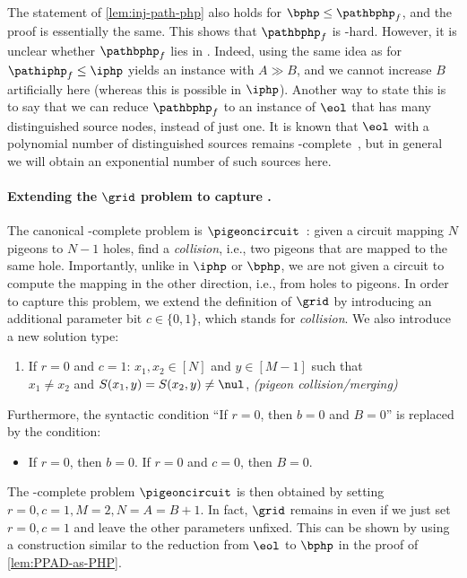 The statement of \cref{lem:inj-path-php} also holds for $\bphp\leq \pathbphp_f$, and the proof is essentially the same. This shows that $\pathbphp_f$ is \PPAD-hard. However, it is unclear whether $\pathbphp_f$ lies in \PPAD. Indeed, using the same idea as for $\pathiphp_f \leq \iphp$ yields an instance with $A \gg B$, and we cannot increase $B$ artificially here (whereas this is possible in $\iphp$). Another way to state this is to say that we can reduce $\pathbphp_f$ to an instance of $\eol$ that has many distinguished source nodes, instead of just one. It is known that $\eol$ with a polynomial number of distinguished sources remains \PPAD-complete~\cite{Goldberg2021}, but in general we will obtain an exponential number of such sources here.



\paragraph{Extending the $\grid$ problem to capture \PPP.}
The canonical \PPP-complete problem is $\pigeoncircuit$~\cite{Papadimitriou1994}: given a circuit mapping $N$ pigeons to $N-1$ holes, find a \emph{collision}, i.e., two pigeons that are mapped to the same hole. Importantly, unlike in $\iphp$ or $\bphp$, we are not given a circuit to compute the mapping in the other direction, i.e., from holes to pigeons. In order to capture this problem, we extend the definition of $\grid$ by introducing an additional parameter bit $c \in \{0,1\}$, which stands for \emph{collision}. We also introduce a new solution type:
\begin{enumerate}
    \item[5.] If $r=0$ and $c=1$: $x_1,x_2 \in [N]$ and $y \in [M-1]$ such that \\
    $x_1 \neq x_2$ and $S(x_1,y) = S(x_2,y) \neq \nul$, \hfill \emph{(pigeon collision/merging)}
\end{enumerate}
Furthermore, the syntactic condition ``If $r=0$, then $b=0$ and $B=0$'' is replaced by the condition:
\begin{itemize}
    \item If $r=0$, then $b=0$. If $r=0$ and $c=0$, then $B=0$.
\end{itemize}
The \PPP-complete problem $\pigeoncircuit$ is then obtained by setting $r=0, c=1, M=2, N=A=B+1$. In fact, $\grid$ remains in \PPP even if we just set $r=0, c=1$ and leave the other parameters unfixed. This can be shown by using a construction similar to the reduction from $\eol$ to $\bphp$ in the proof of \cref{lem:PPAD-as-PHP}.


